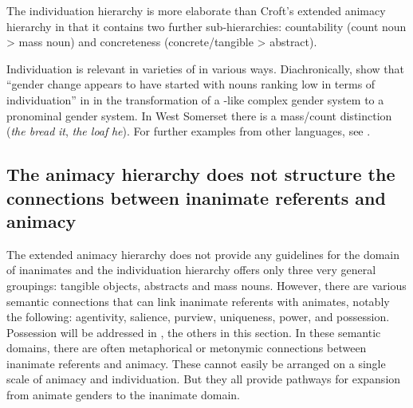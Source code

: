 \documentclass[output=collectionpaper]{langsci/langscibook}
\begin{document}
\largerpage
The individuation hierarchy is more elaborate than Croft's extended animacy hierarchy in that it contains two further sub-hierarchies: countability (count noun > mass noun) and concreteness (concrete/tangible > abstract).

Individuation is relevant in varieties of  in various ways. Diachronically, \cite[527]{Siemund2011} show that ``gender change appears to have started with nouns ranking low in terms of individuation'' in  in the transformation of a -like complex gender system to a pronominal gender system. In West Somerset  there is a mass/count distinction (\textit{the bread} \textendash{} \textit{it}, \textit{the loaf} \textendash{} \textit{he}). For further examples from other languages, see \cite[175--217]{Siemund2008}.

  \subsection{The animacy hierarchy does not structure the connections between inanimate referents and animacy}
\label{sec:WDG:3.3}

The extended animacy hierarchy does not provide any guidelines for the domain of inanimates and the individuation hierarchy offers only three very general groupings: tangible objects, abstracts and mass nouns. However, there are various semantic connections that can link inanimate referents with animates, notably the following: agentivity, salience, purview, uniqueness, power, and possession. Possession will be addressed in , the others in this section. In these semantic domains, there are often metaphorical or metonymic connections between inanimate referents and animacy. These cannot easily be arranged on a single scale of animacy and individuation. But they all provide pathways for expansion from animate genders to the inanimate domain.
\end{document}
